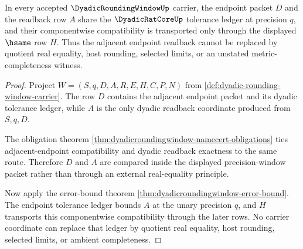 \begin{theorem}
\label{thm:dyadicroundingwindow-adjacent-endpoint-compatibility}
In every accepted $\DyadicRoundingWindowUp$ carrier, the endpoint packet $D$ and the readback row $A$ share the $\DyadicRatCoreUp$ tolerance ledger at precision $q$, and their componentwise compatibility is transported only through the displayed $\hsame$ row $H$. Thus the adjacent endpoint readback cannot be replaced by quotient real equality, host rounding, selected limits, or an unstated metric-completeness witness.
\end{theorem}
\begin{proof}
Project $W=(S,q,D,A,R,E,H,C,P,N)$ from \autoref{def:dyadic-rounding-window-carrier}. The row $D$ contains the adjacent endpoint packet and its dyadic tolerance ledger, while $A$ is the only dyadic readback coordinate produced from $S,q,D$.

The obligation theorem \autoref{thm:dyadicroundingwindow-namecert-obligations} ties adjacent-endpoint compatibility and dyadic readback exactness to the same route. Therefore $D$ and $A$ are compared inside the displayed precision-window packet rather than through an external real-equality principle.

Now apply the error-bound theorem \autoref{thm:dyadicroundingwindow-error-bound}. The endpoint tolerance ledger bounds $A$ at the unary precision $q$, and $H$ transports this componentwise compatibility through the later rows. No carrier coordinate can replace that ledger by quotient real equality, host rounding, selected limits, or ambient completeness.
\end{proof}

